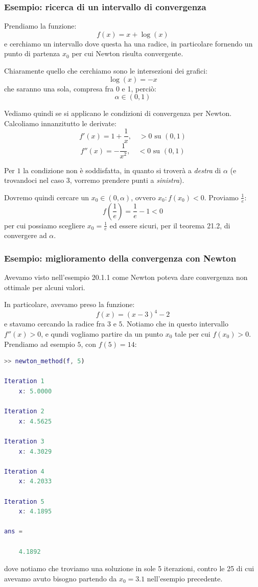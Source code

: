 \documentclass[a4paper,11pt]{article}
\begin{document}
\subsubsection{Esempio: ricerca di un intervallo di convergenza}
Prendiamo la funzione:
$$
f(x) = x + \log(x)
$$
e cerchiamo un intervallo dove questa ha una radice, in particolare fornendo un punto di partenza $x_0$ per cui Newton risulta convergente.

Chiaramente quello che cerchiamo sono le intersezioni dei grafici:
$$
\log(x) = -x
$$
che saranno una sola, compresa fra 0 e 1, perciò:
$$
\alpha \in (0, 1)
$$

Vediamo quindi se si applicano le condizioni di convergenza per Newton.
Calcoliamo innanzitutto le derivate:
$$
f'(x) = 1 + \frac{1}{x}, \quad > 0 \text{ su } (0, 1)
$$
$$
f''(x) = -\frac{1}{x^2}, \quad < 0 \text{ su } (0, 1)
$$

Per $1$ la condizione non è soddisfatta, in quanto si troverà a \textit{destra} di $\alpha$ (e trovandoci nel caso 3, vorremo prendere punti a \textit{sinistra}).

Dovremo quindi cercare un $x_0 \in (0, \alpha)$, ovvero $x_0 : f(x_0) < 0$.
Proviamo $\frac{1}{e}$:
$$
f\left(\frac{1}{e}\right) = \frac{1}{e} - 1 < 0
$$
per cui possiamo scegliere $x_0 = \frac{1}{e}$ ed essere sicuri, per il teorema 21.2, di convergere ad $\alpha$.

\subsubsection{Esempio: miglioramento della convergenza con Newton}
Avevamo visto nell'esempio 20.1.1 come Newton poteva dare convergenza non ottimale per alcuni valori.

In particolare, avevamo preso la funzione:
$$
f\left(x\right)=\left(x-3\right)^{4}-2
$$
e stavamo cercando la radice fra $3$ e $5$.
Notiamo che in questo intervallo $f''(x) > 0$, e qundi vogliamo partire da un punto $x_0$ tale per cui $f(x_0) > 0$. 
Prendiamo ad esempio $5$, con $f(5) = 14$:
\begin{lstlisting}[language=MATLAB, style=codestyle]	
>> newton_method(f, 5)

Iteration 1
	x: 5.0000

Iteration 2
	x: 4.5625

Iteration 3
	x: 4.3029

Iteration 4
	x: 4.2033

Iteration 5
	x: 4.1895

ans =

    4.1892
\end{lstlisting}
dove notiamo che troviamo una soluzione in sole 5 iterazioni, contro le 25 di cui avevamo avuto bisogno partendo da $x_0 = 3.1$ nell'esempio precedente.
\end{document}
